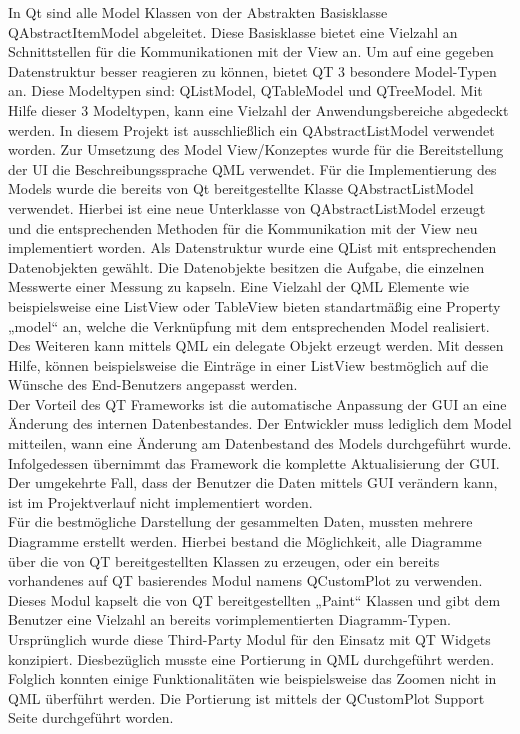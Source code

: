 In Qt sind alle Model Klassen von der Abstrakten Basisklasse QAbstractItemModel abgeleitet. Diese Basisklasse bietet eine Vielzahl an Schnittstellen für die Kommunikationen mit der View an. Um auf eine gegeben Datenstruktur besser reagieren zu können, bietet QT 3 besondere Model-Typen an. Diese Modeltypen sind: QListModel, QTableModel und QTreeModel. Mit Hilfe dieser 3 Modeltypen, kann eine Vielzahl der Anwendungsbereiche abgedeckt werden. In diesem Projekt ist ausschließlich ein QAbstractListModel verwendet worden. Zur Umsetzung des Model View/Konzeptes wurde für die Bereitstellung der UI die Beschreibungssprache QML verwendet. Für die Implementierung des Models wurde die bereits von Qt bereitgestellte Klasse QAbstractListModel verwendet. Hierbei ist eine neue Unterklasse von QAbstractListModel erzeugt und die entsprechenden Methoden für die Kommunikation mit der View neu implementiert worden. Als Datenstruktur wurde eine QList mit entsprechenden Datenobjekten gewählt. Die Datenobjekte besitzen die Aufgabe, die einzelnen Messwerte einer Messung zu kapseln. Eine Vielzahl der QML Elemente wie beispielsweise eine ListView oder TableView bieten standartmäßig eine Property „model“ an, welche die Verknüpfung mit dem entsprechenden Model realisiert. Des Weiteren kann mittels QML ein delegate Objekt erzeugt werden. Mit dessen Hilfe, können beispielsweise die Einträge in einer ListView bestmöglich auf die Wünsche des End-Benutzers angepasst werden. \\

Der Vorteil des QT Frameworks ist die automatische Anpassung der GUI an eine Änderung des internen Datenbestandes. Der Entwickler muss lediglich dem Model mitteilen, wann eine Änderung am Datenbestand des Models durchgeführt wurde. Infolgedessen übernimmt das Framework die komplette Aktualisierung der GUI. Der umgekehrte Fall, dass der Benutzer die Daten mittels GUI verändern kann, ist im Projektverlauf nicht implementiert worden. \\

Für die bestmögliche Darstellung der gesammelten Daten, mussten mehrere Diagramme erstellt werden. Hierbei bestand die Möglichkeit, alle Diagramme über die von QT bereitgestellten Klassen zu erzeugen, oder ein bereits vorhandenes auf QT basierendes Modul namens QCustomPlot zu verwenden. Dieses Modul kapselt die von QT bereitgestellten „Paint“ Klassen und gibt dem Benutzer eine Vielzahl an bereits vorimplementierten Diagramm-Typen. Ursprünglich wurde diese Third-Party Modul für den Einsatz mit QT Widgets konzipiert. Diesbezüglich musste eine Portierung in QML durchgeführt werden. Folglich konnten einige Funktionalitäten wie beispielsweise das Zoomen nicht in QML überführt werden. Die Portierung ist mittels der QCustomPlot Support Seite durchgeführt worden. \\

